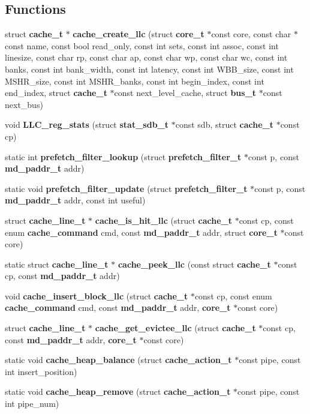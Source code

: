 \subsection*{Functions}
\begin{CompactItemize}
\item 
struct {\bf cache\_\-t} $\ast$ {\bf cache\_\-create\_\-llc} (struct {\bf core\_\-t} $\ast$const core, const char $\ast$const name, const bool read\_\-only, const int sets, const int assoc, const int linesize, const char rp, const char ap, const char wp, const char wc, const int banks, const int bank\_\-width, const int latency, const int WBB\_\-size, const int MSHR\_\-size, const int MSHR\_\-banks, const int begin\_\-index, const int end\_\-index, struct {\bf cache\_\-t} $\ast$const next\_\-level\_\-cache, struct {\bf bus\_\-t} $\ast$const next\_\-bus)
\item 
void {\bf LLC\_\-reg\_\-stats} (struct {\bf stat\_\-sdb\_\-t} $\ast$const sdb, struct {\bf cache\_\-t} $\ast$const cp)
\item 
static int {\bf prefetch\_\-filter\_\-lookup} (struct {\bf prefetch\_\-filter\_\-t} $\ast$const p, const {\bf md\_\-paddr\_\-t} addr)
\item 
static void {\bf prefetch\_\-filter\_\-update} (struct {\bf prefetch\_\-filter\_\-t} $\ast$const p, const {\bf md\_\-paddr\_\-t} addr, const int useful)
\item 
struct {\bf cache\_\-line\_\-t} $\ast$ {\bf cache\_\-is\_\-hit\_\-llc} (struct {\bf cache\_\-t} $\ast$const cp, const enum {\bf cache\_\-command} cmd, const {\bf md\_\-paddr\_\-t} addr, struct {\bf core\_\-t} $\ast$const core)
\item 
static struct {\bf cache\_\-line\_\-t} $\ast$ {\bf cache\_\-peek\_\-llc} (const struct {\bf cache\_\-t} $\ast$const cp, const {\bf md\_\-paddr\_\-t} addr)
\item 
void {\bf cache\_\-insert\_\-block\_\-llc} (struct {\bf cache\_\-t} $\ast$const cp, const enum {\bf cache\_\-command} cmd, const {\bf md\_\-paddr\_\-t} addr, {\bf core\_\-t} $\ast$const core)
\item 
struct {\bf cache\_\-line\_\-t} $\ast$ {\bf cache\_\-get\_\-evictee\_\-llc} (struct {\bf cache\_\-t} $\ast$const cp, const {\bf md\_\-paddr\_\-t} addr, {\bf core\_\-t} $\ast$const core)
\item 
static void {\bf cache\_\-heap\_\-balance} (struct {\bf cache\_\-action\_\-t} $\ast$const pipe, const int insert\_\-position)
\item 
static void {\bf cache\_\-heap\_\-remove} (struct {\bf cache\_\-action\_\-t} $\ast$const pipe, const int pipe\_\-num)

\end{CompactItemize}
